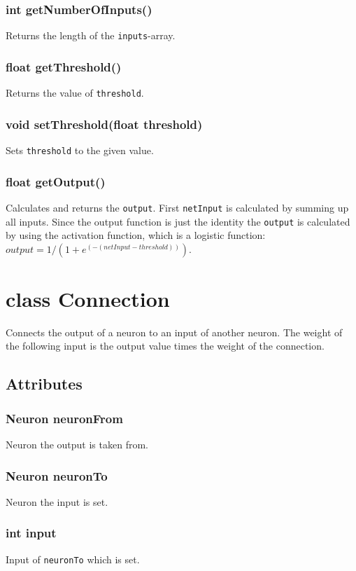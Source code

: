 \subsection{int getNumberOfInputs()}
Returns the length of the \texttt{inputs}-array.

\subsection{float getThreshold()}
Returns the value of \texttt{threshold}.

\subsection{void setThreshold(float threshold)}
Sets \texttt{threshold} to the given value.

\subsection{float getOutput()}
Calculates and returns the \texttt{output}. First \texttt{netInput} is calculated by summing up all inputs. Since the output function is just the identity the \texttt{output} is calculated by using the activation function, which is a logistic function: $output = 1 / (1 + e^{(-(netInput - threshold))})$.

\chapter{class Connection}
Connects the output of a neuron to an input of another neuron. The weight of the following input is the output value times the weight of the connection.

\section{Attributes}
\subsection{Neuron neuronFrom}
Neuron the output is taken from.

\subsection{Neuron neuronTo}
Neuron the input is set.

\subsection{int input}
Input of \texttt{neuronTo} which is set.

